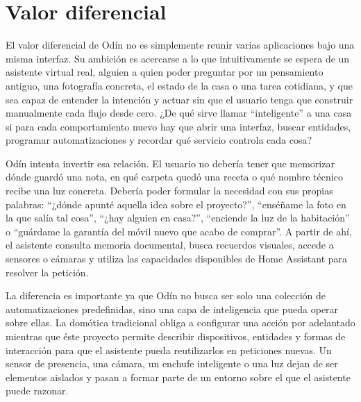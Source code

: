 \section{Valor diferencial}
El valor diferencial de Odín no es simplemente reunir varias aplicaciones bajo una misma interfaz. Su ambición es acercarse a lo que intuitivamente se espera de un asistente virtual real, alguien a quien poder preguntar por un pensamiento antiguo, una fotografía concreta, el estado de la casa o una tarea cotidiana, y que sea capaz de entender la intención y actuar sin que el usuario tenga que construir manualmente cada flujo desde cero. ¿De qué sirve llamar ``inteligente'' a una casa si para cada comportamiento nuevo hay que abrir una interfaz, buscar entidades, programar automatizaciones y recordar qué servicio controla cada cosa?

Odín intenta invertir esa relación. El usuario no debería tener que memorizar dónde guardó una nota, en qué carpeta quedó una receta o qué nombre técnico recibe una luz concreta. Debería poder formular la necesidad con sus propias palabras: ``¿dónde apunté aquella idea sobre el proyecto?'', ``enséñame la foto en la que salía tal cosa'', ``¿hay alguien en casa?'', ``enciende la luz de la habitación'' o ``guárdame la garantía del móvil nuevo que acabo de comprar''. A partir de ahí, el asistente consulta memoria documental, busca recuerdos visuales, accede a sensores o cámaras y utiliza las capacidades disponibles de Home Assistant para resolver la petición.

La diferencia es importante ya que Odín no busca ser solo una colección de automatizaciones predefinidas, sino una capa de inteligencia que pueda operar sobre ellas. La domótica tradicional obliga a configurar una acción por adelantado mientras que éste proyecto permite describir dispositivos, entidades y formas de interacción para que el asistente pueda reutilizarlos en peticiones nuevas. Un sensor de presencia, una cámara, un enchufe inteligente o una luz dejan de ser elementos aislados y pasan a formar parte de un entorno sobre el que el asistente puede razonar.

